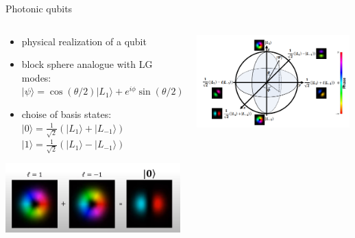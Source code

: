 \documentclass[aspectratio=169,9pt]{beamer}
\begin{document}
\begin{frame}[t]{Photonic qubits}
  \begin{columns}
    \begin{column}[]{0.5\textwidth}
      \begin{itemize}
        \item physical realization of a qubit
        \item block sphere analogue with LG modes: $|\psi\rangle=\cos(\theta/2)|L_1\rangle + e^{i\phi}\sin(\theta/2)|L_{-1}\rangle$
        \item choise of basis states: \\
        $|0\rangle= \frac{1}{\sqrt{2}}(|L_1\rangle + |L_{-1}\rangle)$\\
        $|1\rangle= \frac{1}{\sqrt{2}}(|L_1\rangle - |L_{-1}\rangle)$
      \end{itemize}
      \includegraphics[width=0.99\textwidth]{photonic_superposition_qubit.png}
    \end{column}
    \begin{column}[]{0.5\textwidth}
      \includegraphics[width=0.99\textwidth]{photonic_bloch_sphere.png}
    \end{column}
  \end{columns}
\end{frame}
\end{document}
